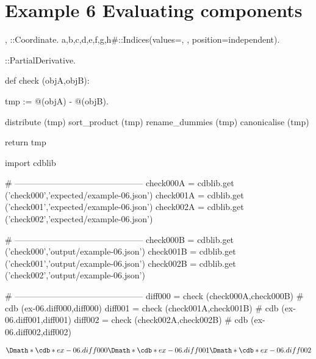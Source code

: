 \documentclass[12pt]{cdblatex}
\begin{document}
\section*{Example 6 Evaluating components}


\begin{cadabra}
   {\theta, \varphi}::Coordinate.
   {a,b,c,d,e,f,g,h#}::Indices(values={\theta, \varphi}, position=independent).

   \partial{#}::PartialDerivative.

   def check (objA,objB):

       tmp := @(objA) - @(objB).

       distribute     (tmp)
       sort_product   (tmp)
       rename_dummies (tmp)
       canonicalise   (tmp)

       return tmp

   import cdblib

   # ---------------------------------------------
   check000A = cdblib.get ('check000','expected/example-06.json')
   check001A = cdblib.get ('check001','expected/example-06.json')
   check002A = cdblib.get ('check002','expected/example-06.json')

   # ---------------------------------------------
   check000B = cdblib.get ('check000','output/example-06.json')
   check001B = cdblib.get ('check001','output/example-06.json')
   check002B = cdblib.get ('check002','output/example-06.json')

   # ---------------------------------------------
   diff000 = check (check000A,check000B)   # cdb (ex-06.diff000,diff000)
   diff001 = check (check001A,check001B)   # cdb (ex-06.diff001,diff001)
   diff002 = check (check002A,check002B)   # cdb (ex-06.diff002,diff002)

\end{cadabra}


\begin{dgroup*}
   \Dmath*{\cdb*{ex-06.diff000}}
   \Dmath*{\cdb*{ex-06.diff001}}
   \Dmath*{\cdb*{ex-06.diff002}}
\end{dgroup*}
\end{document}
